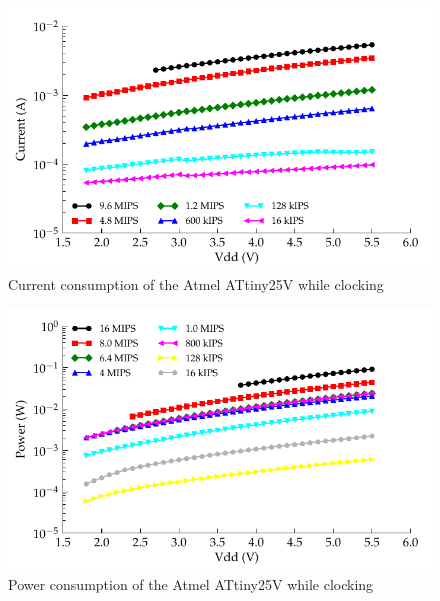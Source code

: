 \begin{figure}
\begin{centering}
\includegraphics{content/appendices/microprocessorPowerMeasurements/graphics/Graph_ATtiny13V_Clock_Current}
\par\end{centering}

\protect\caption{\label{fig:ATtiny25VClkCurrent}Current consumption of the Atmel ATtiny25V
while clocking}


\end{figure}
\begin{figure}
\begin{centering}
\includegraphics{content/appendices/microprocessorPowerMeasurements/graphics/Graph_ATtiny25V_Clock_Power}
\par\end{centering}

\protect\caption{
\label{fig:ATtiny25VClkPower}Power consumption of the Atmel ATtiny25V
while clocking
}


\end{figure}
